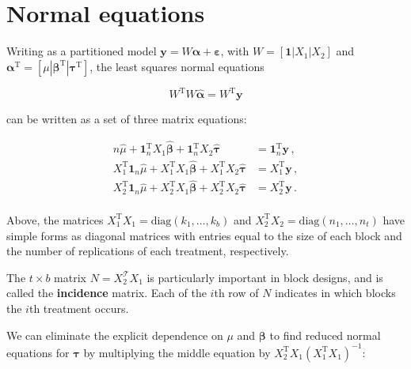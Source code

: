 \documentclass[
]{book}
\theoremstyle{definition}
\theoremstyle{definition}
\theoremstyle{definition}
\theoremstyle{definition}
\theoremstyle{remark}
\begin{document}
\hypertarget{normal-equations}{%
\section{Normal equations}\label{normal-equations}}

Writing as a partitioned model \(\boldsymbol{y}= W\boldsymbol{\alpha} + \boldsymbol{\varepsilon}\), with \(W = [\boldsymbol{1} | X_1 | X_2]\) and \(\boldsymbol{\alpha}^{\mathrm{T}} = [\mu | \boldsymbol{\beta}^{\mathrm{T}} | \boldsymbol{\tau}^{\mathrm{T}}]\), the least squares normal equations

\begin{equation}
W^{\mathrm{T}}W \hat{\boldsymbol{\alpha}} = W^{\mathrm{T}}\boldsymbol{y}
\label{eq:bne}
\end{equation}

can be written as a set of three matrix equations:

\begin{align}
n\hat{\mu} + \boldsymbol{1}_n^{\mathrm{T}}X_1\hat{\boldsymbol{\beta}} + \boldsymbol{1}_n^{\mathrm{T}}X_2\hat{\boldsymbol{\tau}} & = \boldsymbol{1}_n^{\mathrm{T}}\boldsymbol{y}\,, \label{eq:blocks-normal-1}\\
X_1^{\mathrm{T}}\boldsymbol{1}_n\hat{\mu} + X_1^{\mathrm{T}}X_1\hat{\boldsymbol{\beta}} + X_1^{\mathrm{T}}X_2\hat{\boldsymbol{\tau}} & = X_1^{\mathrm{T}}\boldsymbol{y}\,, \label{eq:blocks-normal-2}\\
X_2^{\mathrm{T}}\boldsymbol{1}_n\hat{\mu} + X_2^{\mathrm{T}}X_1\hat{\boldsymbol{\beta}} + X_2^{\mathrm{T}}X_2\hat{\boldsymbol{\tau}} & = X_2^{\mathrm{T}}\boldsymbol{y}\,. \label{eq:blocks-normal-3}\\
\end{align}

Above, the matrices \(X_1^{\mathrm{T}}X_1 = \mathrm{diag}(k_1,\ldots,k_b)\) and \(X_2^{\mathrm{T}}X_2 = \mathrm{diag}(n_1,\ldots,n_t)\) have simple forms as diagonal matrices with entries equal to the size of each block and the number of replications of each treatment, respectively.

The \(t\times b\) matrix \(N = X_2^{\mathcal{T}}X_1\) is particularly important in block designs, and is called the \textbf{incidence} matrix. Each of the \(i\)th row of \(N\) indicates in which blocks the \(i\)th treatment occurs.

We can eliminate the explicit dependence on \(\mu\) and \(\boldsymbol{\beta}\) to find reduced normal equations for \(\boldsymbol{\tau}\) by multiplying the middle equation by \(X_2^{\mathrm{T}}X_1(X_1^{\mathrm{T}}X_1)^{-1}\):
\end{document}
